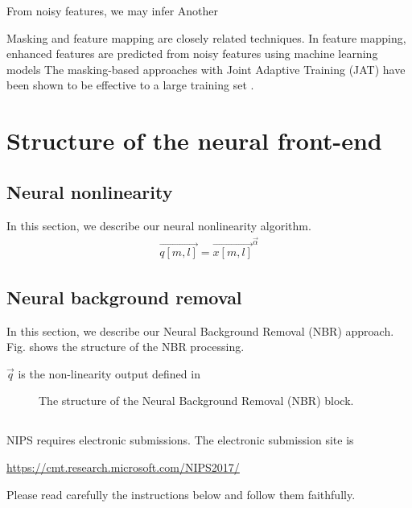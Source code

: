 \documentclass{article}
\begin{document}
From noisy features, we may infer 
Another 

Masking and feature mapping are closely related techniques.
In feature mapping, enhanced features are predicted from
noisy features using machine learning models
The masking-based approaches with
Joint Adaptive Training (JAT) have been shown
to be effective to a large training set
\cite{a_narayanan_interspeech_2015_1}.



\section{Structure of the neural front-end}

\subsection{Neural nonlinearity}
In this section, we describe our neural nonlinearity algorithm. 
\begin{align}
  \vec{q[m, l]} = \vec{x[m, l]} ^ {\vec{\alpha}} 
\end{align}

\subsection{Neural background removal}
In this section, we describe our Neural Background Removal (NBR) approach.
Fig. \label{fig:nbr_diagram} shows the structure of the NBR processing.

$\vec{q}$ is the non-linearity output defined in 

\begin{figure}
    \centering
    \resizebox{80mm}{!}{%
         } %
    \caption {
      The structure of the Neural Background Removal (NBR) block.
      \label{fig:nbr_diagam}
    }
\end{figure}


\subsection{  }

NIPS requires electronic submissions.  The electronic submission site
is
\begin{center}
  \url{https://cmt.research.microsoft.com/NIPS2017/}
\end{center}

Please read carefully the instructions below and follow them
faithfully.
\end{document}

